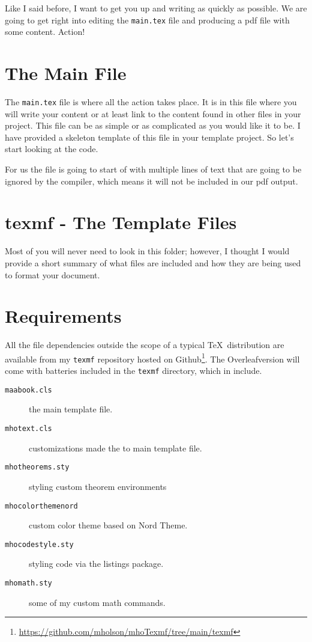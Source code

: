 Like I said before, I want to get you up and writing as quickly as possible.
We are going to get right into editing the \texttt{main.tex} file and producing
a pdf file with some content.  Action!

\section{The Main File}
The \texttt{main.tex} file is where all the action takes place.  It is in this
file where you will write your content or at least link to the content found in
other files in your project.  This file can be as simple or as complicated as 
you would like it to be.  I have provided a skeleton template of this file in
your template project.  So let's start looking at the code.

For us the file is going to start of with multiple lines of text that are going
to be ignored by the compiler, which means it will not be included in our pdf
output.

\section{texmf - The Template Files}

Most of you will never need to look in this folder; however, I thought I would
provide a short summary of what files are included and how they are being used
to format your document.

\section{Requirements}

All the file dependencies outside the scope of a typical \TeX\, distribution
are available from my \texttt{texmf} repository hosted on
Github\footnote{\url{https://github.com/mholson/mhoTexmf/tree/main/texmf}}.
The Overleaf\texttrademark version will come with batteries included in the 
\texttt{texmf} directory, which in include.  
\begin{description}
    \item[\texttt{maabook.cls}] the main template file.
    \item[\texttt{mhotext.cls}] customizations made the to main template file.
    \item[\texttt{mhotheorems.sty}] styling custom theorem environments
    \item[\texttt{mhocolorthemenord}] custom color theme based on Nord Theme.
    \item[\texttt{mhocodestyle.sty}] styling code via the listings package.
    \item[\texttt{mhomath.sty}] some of my custom math commands.  
\end{description}



